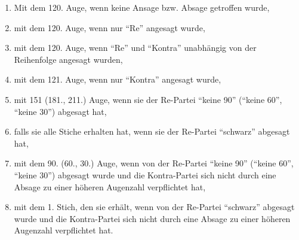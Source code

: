 \documentclass[12pt]{scrartcl}
\begin{document}
\begin{enumerate}
  \item Mit dem 120. Auge, wenn keine Ansage bzw. Absage getroffen wurde,
  \item mit dem 120. Auge, wenn nur "`Re"' angesagt wurde,
  \item mit dem 120. Auge, wenn "`Re"' und "`Kontra"' unabhängig von der Reihenfolge angesagt wurden,
  \item mit dem 121. Auge, wenn nur "`Kontra"' angesagt wurde,
  \item mit 151 (181., 211.) Auge, wenn sie der Re-Partei "`keine 90"' ("`keine 60"', "`keine 30"') abgesagt hat,
  \item falls sie alle Stiche erhalten hat, wenn sie der Re-Partei "`schwarz"' abgesagt hat,
  \item mit dem 90. (60., 30.) Auge, wenn von der Re-Partei "`keine 90"' ("`keine 60"', "`keine 30"') abgesagt
    wurde und die Kontra-Partei sich nicht durch eine Absage zu einer höheren Augenzahl verpflichtet hat,
  \item mit dem 1. Stich, den sie erhält, wenn von der Re-Partei "`schwarz"' abgesagt wurde und die Kontra-Partei
    sich nicht durch eine Absage zu einer höheren Augenzahl verpflichtet hat.
\end{enumerate}
\end{document}

